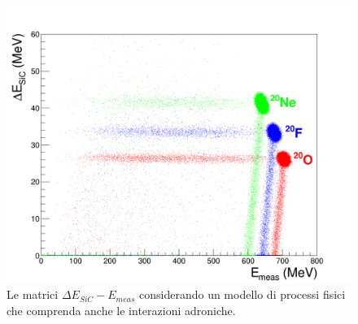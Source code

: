



















\subsection{} \label{par:interazioni_adroniche}

\begin{figure} [!p]
	\centering
	\includegraphics[width=\textwidth, keepaspectratio]{Grafici_Tesi2/Interazioni_adroniche/deltaE_ETot_quadrata.png}
	\caption{Le matrici $\Delta E_{SiC} - E_{meas}$ considerando un modello di processi fisici che comprenda anche le interazioni adroniche.} \label{fig:deltaE_ERes_adron}
\end{figure}





